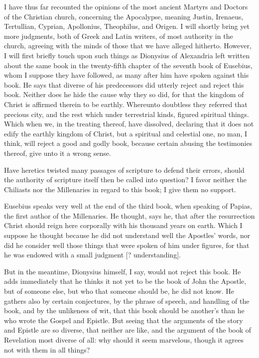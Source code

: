 I have thus far recounted the opinions of the most ancient Martyrs and Doctors of the Christian church, concerning the Apocalypse, meaning Justin, Irenaeus, Tertullian, Cyprian, Apollonius, Theophilus, and Origen. I will shortly bring yet more judgments, both of Greek and Latin writers, of most authority in the church, agreeing with the minds of those that we have alleged hitherto. However, I will first briefly touch upon such things as Dionysius of Alexandria left written about the same book in the twenty-fifth chapter of the seventh book of Eusebius, whom I suppose they have followed, as many after him have spoken against this book. He says that diverse of his predecessors did utterly reject and reject this book. Neither does he hide the cause why they so did, for that the kingdom of Christ is affirmed therein to be earthly. Whereunto doubtless they referred that precious city, and the rest which under terrestrial kinds, figured spiritual things. Which when we, in the treating thereof, have dissolved, declaring that it does not edify the earthly kingdom of Christ, but a spiritual and celestial one, no man, I think, will reject a good and godly book, because certain abusing the testimonies thereof, give unto it a wrong sense.

Have heretics twisted many passages of scripture to defend their errors, should the authority of scripture itself then be called into question? I favor neither the Chiliasts nor the Millenaries in regard to this book; I give them no support.

Eusebius speaks very well at the end of the third book, when speaking of Papias, the first author of the Millenaries. He thought, says he, that after the resurrection Christ should reign here corporally with his thousand years on earth. Which I suppose he thought because he did not understand well the Apostles' words, nor did he consider well those things that were spoken of him under figures, for that he was endowed with a small judgment [? understanding].

But in the meantime, Dionysius himself, I say, would not reject this book. He adds immediately that he thinks it not yet to be the book of John the Apostle, but of someone else, but who that someone should be, he did not know. He gathers also by certain conjectures, by the phrase of speech, and handling of the book, and by the unlikeness of wit, that this book should be another’s than he who wrote the Gospel and Epistle. But seeing that the arguments of the story and Epistle are so diverse, that neither are like, and the argument of the book of Revelation most diverse of all: why should it seem marvelous, though it agrees not with them in all things?

